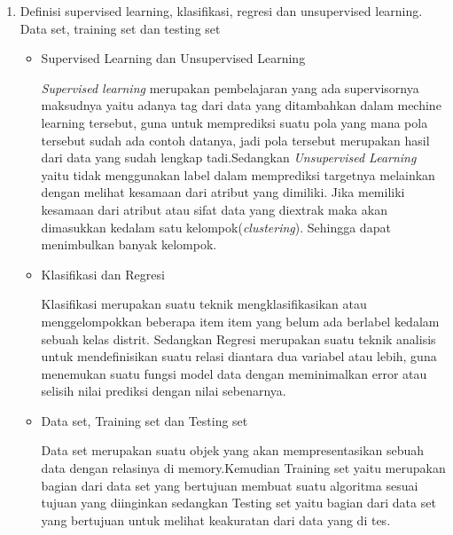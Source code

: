 \begin{enumerate}
\item Definisi supervised learning, klasifikasi, regresi dan unsupervised learning. Data set, training set dan testing set
\begin{itemize}
    \item Supervised Learning dan Unsupervised Learning
    \par
    \textit{Supervised learning} merupakan pembelajaran yang ada supervisornya maksudnya yaitu adanya tag dari data yang ditambahkan dalam mechine learning tersebut, guna untuk memprediksi suatu pola yang mana pola tersebut sudah ada contoh datanya, jadi pola tersebut merupakan hasil dari data yang sudah lengkap tadi.Sedangkan \textit{Unsupervised Learning} yaitu tidak menggunakan label dalam memprediksi targetnya melainkan dengan melihat kesamaan dari atribut yang dimiliki. Jika memiliki kesamaan dari atribut atau sifat data yang diextrak maka akan dimasukkan kedalam satu kelompok(\textit{clustering}). Sehingga dapat menimbulkan banyak kelompok.
    \item Klasifikasi dan Regresi
    \par
    Klasifikasi merupakan suatu teknik mengklasifikasikan atau menggelompokkan beberapa item item yang belum ada berlabel kedalam sebuah kelas distrit. Sedangkan Regresi merupakan suatu teknik analisis untuk mendefinisikan suatu relasi diantara dua variabel atau lebih, guna menemukan suatu fungsi model data dengan meminimalkan error atau selisih nilai prediksi dengan nilai sebenarnya.
    \item Data set, Training set dan Testing set
    \par
    Data set merupakan suatu objek yang akan mempresentasikan sebuah data dengan relasinya di memory.Kemudian Training set yaitu merupakan bagian dari data set yang bertujuan membuat suatu algoritma sesuai tujuan yang diinginkan sedangkan Testing set yaitu bagian dari data set yang bertujuan untuk melihat keakuratan dari data yang di tes.
\end{itemize}
\end{enumerate}

